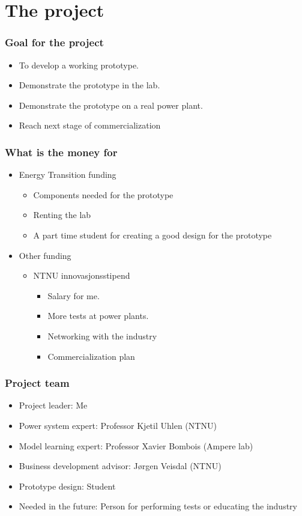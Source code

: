 \section{The project}
\begin{frame}
	\frametitle{Goal for the project}
		\begin{itemize}
		\item To develop a working prototype.
		\item Demonstrate the prototype in the lab.
		\item Demonstrate the prototype on a real power plant.
		\item Reach next stage of commercialization
		\end{itemize}
\end{frame}
\begin{frame}
	\frametitle{What is the money for}
		\begin{itemize}
				\item Energy Transition funding
				\begin{itemize}
						\item Components needed for the prototype
						\item Renting the lab
						\item A part time student for creating a good design for the prototype
				\end{itemize}
				\item Other funding
				\begin{itemize}
					\item NTNU innovasjonsstipend
					\begin{itemize}
							\item Salary for me.
							\item More tests at power plants.
							\item Networking with the industry
							\item Commercialization plan
					\end{itemize}
				\end{itemize}
		\end{itemize}
\end{frame}
\begin{frame}
	\frametitle{Project team}
		\begin{itemize}
			\item Project leader: Me
			\item Power system expert: Professor Kjetil Uhlen (NTNU)
			\item Model learning expert: Professor Xavier Bombois (Ampere lab)
			\item Business development advisor: Jørgen Veisdal (NTNU)
			\item Prototype design: Student
			\item Needed in the future: Person for performing tests or educating the industry
		\end{itemize}
\end{frame}
